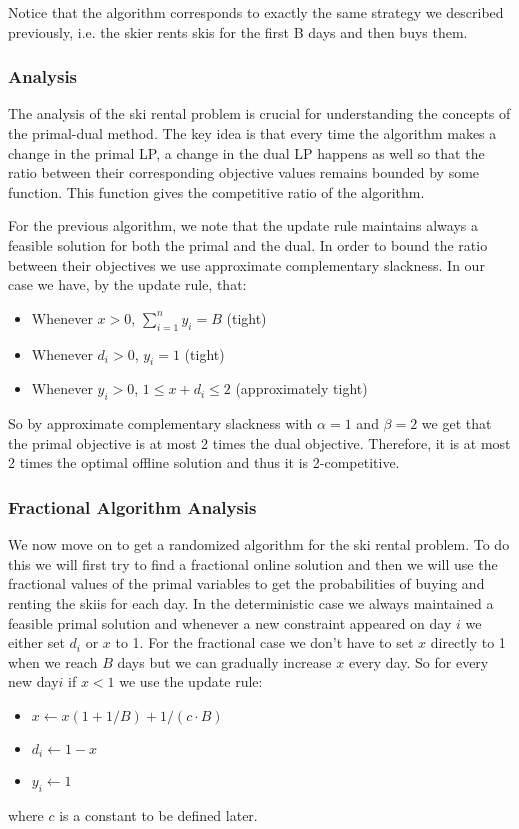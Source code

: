 Notice that the algorithm corresponds to exactly the same strategy we described previously, i.e. the skier rents skis for the first B days and then buys them.

\subsubsection{Analysis}

The analysis of the ski rental problem is crucial for understanding the concepts of the primal-dual method. 
The key idea is that every time the algorithm makes a change in the primal LP, a change in the dual LP happens as well so that the ratio between their corresponding objective values remains bounded by some function. 
This function gives the competitive ratio of the algorithm.

For the previous algorithm, we note that the update rule maintains always a feasible solution for both the primal and the dual. 
In order to bound the ratio between their objectives we use approximate complementary slackness. 
In our case we have, by the update rule, that:
\begin{itemize}
\item Whenever $x > 0$, $\sum^n_{i=1} y_i = B$ (tight)
\item Whenever $d_i > 0$, $y_i = 1$ (tight)
\item Whenever $y_i > 0$, $1 \le x+d_i \le 2$ (approximately tight)
\end{itemize}

So by approximate complementary slackness with $\alpha = 1$ and $\beta = 2$ we get that the primal objective is at most 2 times the dual objective. Therefore, it is at most 2 times the optimal offline solution and thus it is 2-competitive.

\subsubsection{Fractional Algorithm Analysis}
We now move on to get a randomized algorithm for the ski rental problem. 
To do this we will first try to find a fractional online solution and then we will use the fractional values of the primal variables to get the probabilities of buying and renting the skiis for each day.
In the deterministic case we always maintained a feasible primal solution and whenever a new constraint appeared on day $i$ we either set $d_i$ or $x$ to 1. For the fractional case we don't have to set $x$ directly to 1 when we reach $B$ days but we can gradually increase $x$ every day. So for every new day$i$ if $x<1$ we use the update rule:
\begin{itemize}
\item $x \leftarrow x(1+1/B) + 1/(c\cdot B)$
\item $d_i \leftarrow 1 - x$
\item $y_i \leftarrow 1$
\end{itemize}
where $c$ is a constant to be defined later.

